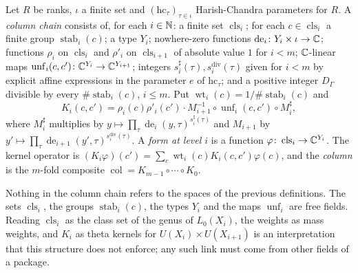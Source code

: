 \begin{definition}\label{geoa:column-chain}
Let $R$ be ranks, $\iota$ a finite set and $(\mathrm{hc}_{\tau})_{\tau\in\iota}$
Harish-Chandra parameters for $R$. A \emph{column chain} consists of, for each
$i\in\mathbb{N}$: a finite set $\operatorname{cls}_i$; for each $c\in\operatorname{cls}_i$ a
finite group $\operatorname{stab}_i(c)$; a type $Y_i$; nowhere-zero functions
$\operatorname{de}_i\colon Y_i\times\iota\to\mathbb{C}$; functions $\rho_i$ on
$\operatorname{cls}_i$ and $\rho'_i$ on $\operatorname{cls}_{i+1}$ of absolute value $1$
for $i<m$; $\mathbb{C}$-linear maps
$\operatorname{unf}_i(c,c')\colon\mathbb{C}^{Y_i}\to\mathbb{C}^{Y_{i+1}}$; integers
$s^{\sharp}_i(\tau),s^{\mathrm{div}}_i(\tau)$ given for $i<m$ by explicit affine
expressions in the parameter $e$ of $\mathrm{hc}_{\tau}$; and a positive integer
$D_{\Gamma}$ divisible by every $\#\operatorname{stab}_i(c)$, $i\le m$. Put
$\operatorname{wt}_i(c)=1/\#\operatorname{stab}_i(c)$ and
\[
K_i(c,c')=\rho_i(c)\rho'_i(c')\cdot M_{i+1}^{-1}\circ\operatorname{unf}_i(c,c')\circ
M^{\sharp}_i,
\]
where $M^{\sharp}_i$ multiplies by $y\mapsto\prod_{\tau}\operatorname{de}_i(y,\tau)^{s^{\sharp}_i(\tau)}$
and $M_{i+1}$ by $y'\mapsto\prod_{\tau}\operatorname{de}_{i+1}(y',\tau)^{s^{\mathrm{div}}_i(\tau)}$.
A \emph{form at level $i$} is a function $\varphi\colon\operatorname{cls}_i\to\mathbb{C}^{Y_i}$.
The kernel operator is $(K_i\varphi)(c')=\sum_{c}\operatorname{wt}_i(c)K_i(c,c')\varphi(c)$,
and the \emph{column} is the $m$-fold composite $\operatorname{col}=K_{m-1}\circ\cdots\circ
K_0$.
\end{definition}

\begin{remark}\label{geoa:rem-column-abstract}
Nothing in the column chain refers to the spaces of the previous definitions. The sets
$\operatorname{cls}_i$, the groups $\operatorname{stab}_i(c)$, the types $Y_i$ and the maps
$\operatorname{unf}_i$ are free fields. Reading $\operatorname{cls}_i$ as the class set of
the genus of $L_0(X_i)$, the weights as mass weights, and $K_i$ as theta kernels for
$U(X_i)\times U(X_{i+1})$ is an interpretation that this structure does not enforce;
any such link must come from other fields of a package.
\end{remark}

